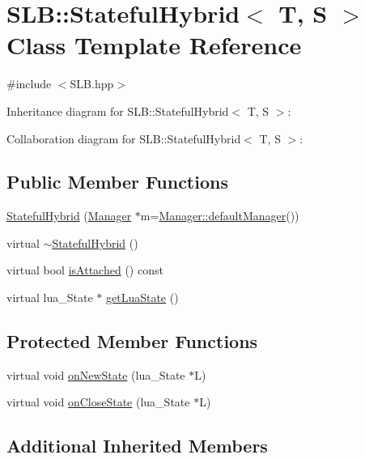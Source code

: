\hypertarget{classSLB_1_1StatefulHybrid}{}\section{S\+LB\+:\+:Stateful\+Hybrid$<$ T, S $>$ Class Template Reference}
\label{classSLB_1_1StatefulHybrid}


{\ttfamily \#include $<$S\+L\+B.\+hpp$>$}



Inheritance diagram for S\+LB\+:\+:Stateful\+Hybrid$<$ T, S $>$\+:


Collaboration diagram for S\+LB\+:\+:Stateful\+Hybrid$<$ T, S $>$\+:
\subsection*{Public Member Functions}
\begin{DoxyCompactItemize}
\item 
\hyperlink{classSLB_1_1StatefulHybrid_ad06607c6e361b8377d7c058245467391}{Stateful\+Hybrid} (\hyperlink{classSLB_1_1Manager}{Manager} $\ast$m=\hyperlink{classSLB_1_1Manager_a174e4612520c3412d10a68e659651677}{Manager\+::default\+Manager}())
\item 
virtual \hyperlink{classSLB_1_1StatefulHybrid_a810dc1b8eeb6fa059691143de289f11c}{$\sim$\+Stateful\+Hybrid} ()
\item 
virtual bool \hyperlink{classSLB_1_1StatefulHybrid_aac044f80a0ebec91f6f917475ff14269}{is\+Attached} () const 
\item 
virtual lua\+\_\+\+State $\ast$ \hyperlink{classSLB_1_1StatefulHybrid_aa2df20e99183de03b3a87b7de7a0bb96}{get\+Lua\+State} ()
\end{DoxyCompactItemize}
\subsection*{Protected Member Functions}
\begin{DoxyCompactItemize}
\item 
virtual void \hyperlink{classSLB_1_1StatefulHybrid_a04ad7225f817785bc7ec954bca627f33}{on\+New\+State} (lua\+\_\+\+State $\ast$L)
\item 
virtual void \hyperlink{classSLB_1_1StatefulHybrid_a1515e8460c9bfb82bcb2c249651addd7}{on\+Close\+State} (lua\+\_\+\+State $\ast$L)
\end{DoxyCompactItemize}
\subsection*{Additional Inherited Members}


